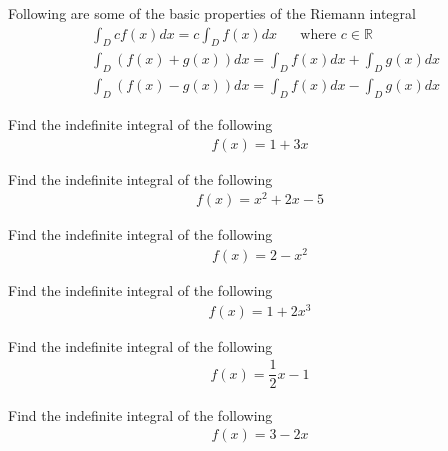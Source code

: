 \begin{theorem}
Following are some of the basic properties of the Riemann integral
\begin{align*}
    &\int_{D} c f(x) dx = c \int_{D} f(x) dx \hspace{20pt} \text{where} \hspace{4pt} c \in \mathbb{R}\\[2ex]
    &\int_{D} (f(x) + g(x)) dx = \int_{D} f(x) dx + \int_{D} g(x) dx\\[2ex]
    &\int_{D} (f(x) - g(x)) dx = \int_{D} f(x) dx - \int_{D} g(x) dx
\end{align*}
\end{theorem}

\begin{exercise}
Find the indefinite integral of the following
\begin{align*}
    f(x) = 1 + 3x
\end{align*}
\end{exercise}

\begin{exercise}
Find the indefinite integral of the following
\begin{align*}
    f(x) = x^{2} + 2x - 5
\end{align*}
\end{exercise}

\begin{exercise}
Find the indefinite integral of the following
\begin{align*}
    f(x) = 2 - x^{2}
\end{align*}
\end{exercise}

\begin{exercise}
Find the indefinite integral of the following
\begin{align*}
    f(x) = 1 + 2x^{3}
\end{align*}
\end{exercise}

\begin{exercise}
Find the indefinite integral of the following
\begin{align*}
    f(x) = \dfrac{1}{2}x - 1
\end{align*}
\end{exercise}

\begin{exercise}
Find the indefinite integral of the following
\begin{align*}
    f(x) = 3 - 2x
\end{align*}
\end{exercise}

